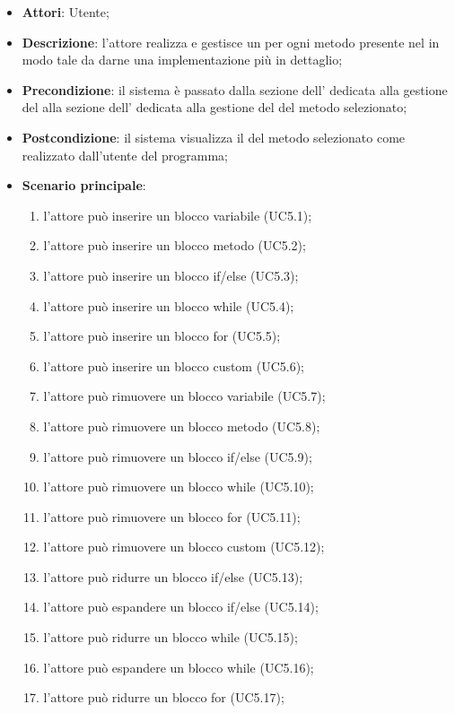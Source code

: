 \begin{itemize}
	\item \textbf{Attori}: Utente;
	\item \textbf{Descrizione}: l'attore realizza e gestisce un  per ogni metodo presente nel  in modo tale da darne una implementazione più in dettaglio;
	\item \textbf{Precondizione}: il sistema è passato dalla sezione dell' dedicata alla gestione del  alla sezione dell' dedicata alla gestione del  del metodo selezionato;
	\item \textbf{Postcondizione}: il sistema visualizza il  del metodo selezionato come realizzato dall'utente del programma;
	\item \textbf{Scenario principale}:
	\begin{enumerate}
		\item l'attore può inserire un blocco variabile (UC5.1);
		\item l'attore può inserire un blocco metodo (UC5.2);
		\item l'attore può inserire un blocco if/else (UC5.3);
		\item l'attore può inserire un blocco while (UC5.4);
		\item l'attore può inserire un blocco for (UC5.5);
		\item l'attore può inserire un blocco custom (UC5.6);
		\item l'attore può rimuovere un blocco variabile (UC5.7);
		\item l'attore può rimuovere un blocco metodo (UC5.8);
		\item l'attore può rimuovere un blocco if/else (UC5.9);
		\item l'attore può rimuovere  un blocco while (UC5.10);
		\item l'attore può rimuovere un blocco for (UC5.11);
		\item l'attore può rimuovere un blocco custom (UC5.12);
		\item l'attore può ridurre un blocco if/else (UC5.13);
		\item l'attore può espandere un blocco if/else (UC5.14);
		\item l'attore può ridurre un blocco while (UC5.15);
		\item l'attore può espandere un blocco while (UC5.16);
		\item l'attore può ridurre un blocco for (UC5.17);

\end{enumerate}
\end{itemize}
